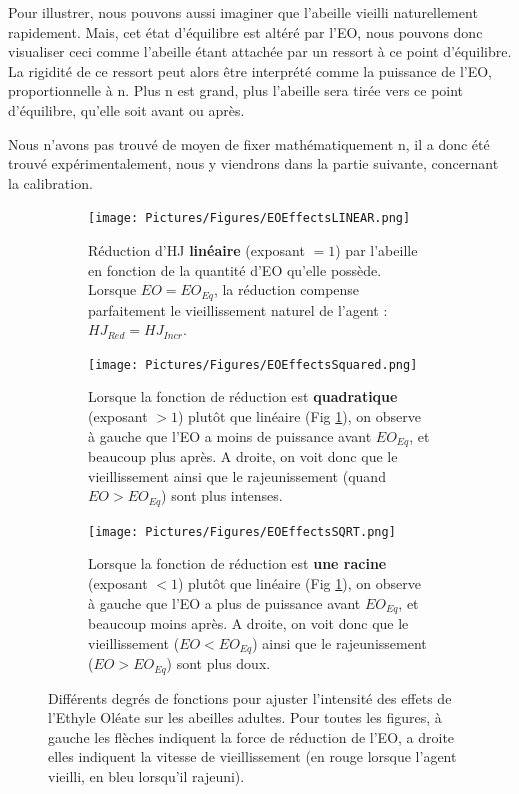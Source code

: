 	Pour illustrer, nous pouvons aussi imaginer que l'abeille vieilli naturellement rapidement. Mais, cet état d'équilibre est altéré par l'EO, nous pouvons donc visualiser ceci comme l'abeille étant attachée par un ressort à ce point d'équilibre. La rigidité de ce ressort peut alors être interprété comme la puissance de l'EO, proportionnelle à n. Plus n est grand, plus l'abeille sera tirée vers ce point d'équilibre, qu'elle soit avant ou après.
	
	Nous n'avons pas trouvé de moyen de fixer mathématiquement n, il a donc été trouvé expérimentalement, nous y viendrons dans la partie suivante, concernant la calibration.
	
	\begin{figure}
	\centering
	
	\begin{subfigure}{\textwidth}
	\centering
	\texttt{[image: Pictures/Figures/EOEffectsLINEAR.png]}
	\caption{Réduction d'HJ \textbf{linéaire} (exposant $= 1$) par l'abeille en fonction de la quantité d'EO qu'elle possède. Lorsque $EO = EO_{Eq}$, la réduction compense parfaitement le vieillissement naturel de l'agent : $HJ_{Red} = HJ_{Incr}$.}
	\label{eoLinear}
	\end{subfigure}
	
	\begin{subfigure}{\textwidth}
	\centering
	\texttt{[image: Pictures/Figures/EOEffectsSquared.png]}
	\caption{Lorsque la fonction de réduction est \textbf{quadratique} (exposant $> 1$) plutôt que linéaire (Fig \ref{eoLinear}), on observe à gauche que l'EO a moins de puissance avant $EO_{Eq}$, et beaucoup plus après. A droite, on voit donc que le vieillissement ainsi que le rajeunissement (quand $EO > EO_{Eq}$) sont plus intenses.}
	\label{eoSquared}
	\end{subfigure}
	
	\begin{subfigure}{\textwidth}
	\centering
	\texttt{[image: Pictures/Figures/EOEffectsSQRT.png]}
	\caption{Lorsque la fonction de réduction est \textbf{une racine} (exposant $< 1$) plutôt que linéaire (Fig \ref{eoLinear}), on observe à gauche que l'EO a plus de puissance avant $EO_{Eq}$, et beaucoup moins après. A droite, on voit donc que le vieillissement ($EO < EO_{Eq}$) ainsi que le rajeunissement ($EO > EO_{Eq}$) sont plus doux.}
	\label{eoSqrt}	
	\end{subfigure}
	
	\caption[Différents degrés de fonctions pour ajuster l'intensité des effets de l'Ethyle Oléate sur les abeilles adultes.]{Différents degrés de fonctions pour ajuster l'intensité des effets de l'Ethyle Oléate sur les abeilles adultes. Pour toutes les figures, à gauche les flèches indiquent la force de réduction de l'EO, a droite elles indiquent la vitesse de vieillissement (en rouge lorsque l'agent vieilli, en bleu lorsqu'il rajeuni).}	
	\label{eoAll}
	\end{figure}
	
